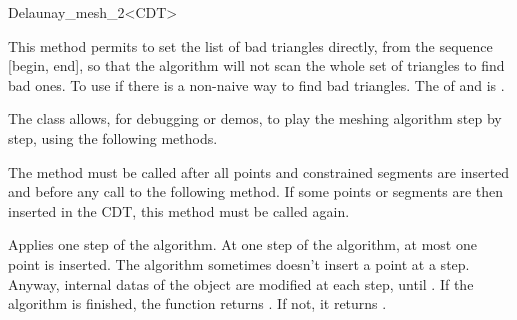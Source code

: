 \begin{ccRefClass}{Delaunay_mesh_2<CDT>}
\begin{ccAdvanced}
                   { This method permits to set the list of bad triangles
                     directly, from the sequence [begin, end], so that the
                     algorithm will not scan the whole set of triangles to
                     find bad ones. To use if there is a non-naive way to
                     find bad triangles.  \ccPrecond The 
                     of  and  is .}

\end{ccAdvanced}


\begin{ccAdvanced}

The \ccRefName{} class allows, for debugging or demos, to play the
meshing algorithm step by step, using the following methods.

         { The method must be called after all points and constrained
           segments are inserted and before any call to the following
           method. If some points or segments are then inserted 
           in the CDT, this method must be called again. }

         { Applies one step of the algorithm. At one step of the algorithm,
           at most one point is inserted. The algorithm
           sometimes doesn't insert a point at a step. Anyway,
           internal datas of the \ccRefName{} object are modified at
           each step, until . If the algorithm
           is finished, the function returns . If not, it 
           returns .}

\end{ccAdvanced}

\end{ccRefClass}

